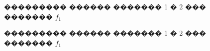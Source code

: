 \documentclass[a4paper]{article}
\begin{document}
\begin{figure}[h]
  \begin{minipage}[h]{\linewidth}
  \end{minipage}
  \vfill
  \begin{minipage}[h]{\linewidth}
  \end{minipage}
  \caption{��������� ������ ������� 1 � 2 ��� ������� $f_1$}
  \label{bg1}
\end{figure}

\begin{figure}[h]
  \begin{minipage}[h]{\linewidth}
  \end{minipage}
  \vfill
  \begin{minipage}[h]{\linewidth}
  \end{minipage}
  \caption{��������� ������ ������� 1 � 2 ��� ������� $f_1$}
  \label{ris:image1}
\end{figure}
\end{document}
